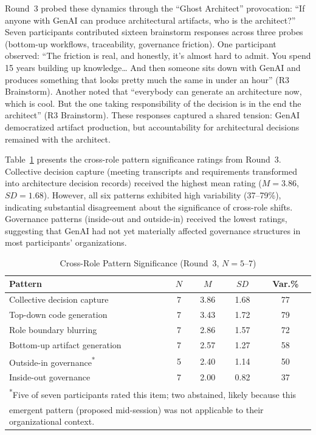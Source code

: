 Round~3 probed these dynamics through the ``Ghost Architect'' provocation:
``If anyone with GenAI can produce architectural artifacts, who is the
architect?'' Seven participants contributed sixteen brainstorm responses across
three probes (bottom-up workflows, traceability, governance friction). One
participant observed:
``The friction is real, and honestly, it's almost hard to admit. You spend 15
years building up knowledge\ldots{} And then someone sits down with GenAI and
produces something that looks pretty much the same in under an hour'' (R3
Brainstorm). Another noted that ``everybody can generate an architecture now,
which is cool. But the one taking responsibility of the decision is in the end
the architect'' (R3 Brainstorm). These responses captured a shared tension:
GenAI democratized artifact production, but accountability for architectural
decisions remained with the architect.

Table~\ref{tab:cross-role} presents the cross-role pattern significance ratings
from Round~3. Collective decision capture (meeting transcripts and requirements
transformed into architecture decision records) received the highest mean rating
($M = 3.86$, $SD = 1.68$). However, all six patterns exhibited high variability
(37--79\%), indicating substantial disagreement about the significance of
cross-role shifts. Governance patterns (inside-out and outside-in) received the
lowest ratings, suggesting that GenAI had not yet materially affected governance
structures in most participants' organizations.

\begin{table}[!ht]
    \centering
    \caption{Cross-Role Pattern Significance (Round~3, $N = 5$--$7$)}\label{tab:cross-role}
    \begin{tabular}{|p{6.5cm}|c|c|c|c|}
        \hline
        \textbf{Pattern} & \textbf{$N$} & \textbf{$M$} & \textbf{$SD$} & \textbf{Var.\%} \\
        \hline
        Collective decision capture & 7 & 3.86 & 1.68 & 77 \\
        \hline
        Top-down code generation & 7 & 3.43 & 1.72 & 79 \\
        \hline
        Role boundary blurring & 7 & 2.86 & 1.57 & 72 \\
        \hline
        Bottom-up artifact generation & 7 & 2.57 & 1.27 & 58 \\
        \hline
        Outside-in governance\textsuperscript{*} & 5 & 2.40 & 1.14 & 50 \\
        \hline
        Inside-out governance & 7 & 2.00 & 0.82 & 37 \\
        \hline
        \multicolumn{5}{l}{\small \textsuperscript{*}Five of seven participants rated this item; two abstained, likely because this} \\
        \multicolumn{5}{l}{\small emergent pattern (proposed mid-session) was not applicable to their organizational context.} \\
        \hline
    \end{tabular}
\end{table}

